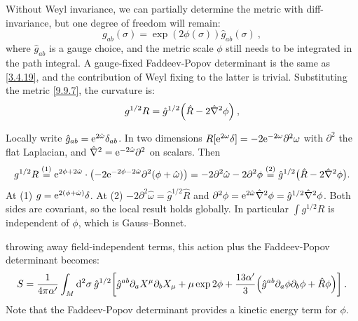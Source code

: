 Without Weyl invariance, we can partially determine the metric with diff-invariance, but one degree of freedom will remain:
\begin{equation}
	g_{ab}(\sigma)=\exp (2 \phi(\sigma)) \hat{g}_{ab}(\sigma) \:, \label{9.9.7}
\end{equation}
where $\hat{g}_{ab}$ is a gauge choice, and the metric scale $\phi$ still needs to be integrated in the path integral. A gauge-fixed Faddeev-Popov determinant is the same as \eqref{3.4.19}, 
and the contribution of Weyl fixing to the latter is trivial.
Substituting the metric \eqref{9.9.7}, the curvature is:
\begin{equation}
	g^{1/2} R = \hat{g}^{1/2}\Bigl(\hat{R}-2 \hat{\nabla}^{2} \phi\Bigr) \:, \label{9.9.8}
\end{equation}
\begin{tcolorbox}[breakable]
	\begin{remark}
		Locally write $\hat g_{ab}=\mathrm{e}^{2\hat\omega}\delta_{ab}$. In two dimensions $R[\mathrm{e}^{2\omega}\delta]=-2\mathrm{e}^{-2\omega}\partial^2\omega$ with $\partial^2$ the flat Laplacian, and $\hat\nabla^2=\mathrm{e}^{-2\hat\omega}\partial^2$ on scalars. Then
		\begin{equation*}
			g^{1/2}R\overset{(1)}{=}\mathrm{e}^{2\phi+2\hat\omega}\cdot\bigl(-2\mathrm{e}^{-2\phi-2\hat\omega}\partial^2(\phi+\hat\omega)\bigr)=-2\partial^2\hat\omega-2\partial^2\phi\overset{(2)}{=}\hat g^{1/2}\bigl(\hat R-2\hat\nabla^2\phi\bigr).
		\end{equation*}
		At (1) $g=\mathrm{e}^{2(\phi+\hat\omega)}\delta$. At (2) $-2\partial^2\hat\omega=\hat g^{1/2}\hat R$ and $\partial^2\phi=\mathrm{e}^{2\hat\omega}\hat\nabla^2\phi=\hat g^{1/2}\hat\nabla^2\phi$. Both sides are covariant, so the local result holds globally. In particular $\int g^{1/2}R$ is independent of $\phi$, which is Gauss--Bonnet.
	\end{remark}
\end{tcolorbox}
throwing away field-independent terms, this action plus the Faddeev-Popov determinant becomes:
\begin{equation}
	S=\frac{1}{4 \pi \alpha^{\prime}} \int_{M} \mathrm{d}^{2} \sigma \: \hat{g}^{1/2} \biggl[\hat{g}^{ab} \partial_{a} X^{\mu} \partial_{b} X_{\mu}+\mu \exp 2 \phi + \frac{13 \alpha^{\prime}}{3}\Bigl(\hat{g}^{ab} \partial_{a} \phi \partial_{b} \phi+\hat{R} \phi\Bigr)\biggr]\:.
	\label{9.9.9}
\end{equation}
Note that the Faddeev-Popov determinant provides a kinetic energy term for $\phi$.
